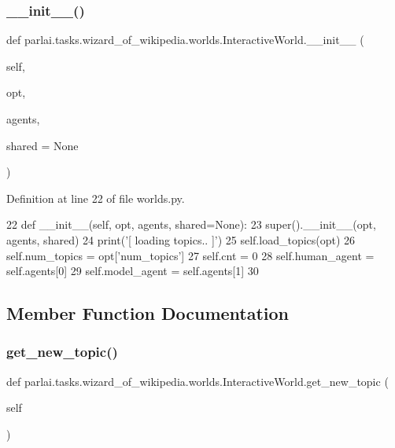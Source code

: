 \subsubsection{\texorpdfstring{\+\_\+\+\_\+init\+\_\+\+\_\+()}{\_\_init\_\_()}}
{\footnotesize\ttfamily def parlai.\+tasks.\+wizard\+\_\+of\+\_\+wikipedia.\+worlds.\+Interactive\+World.\+\_\+\+\_\+init\+\_\+\+\_\+ (\begin{DoxyParamCaption}\item[{}]{self,  }\item[{}]{opt,  }\item[{}]{agents,  }\item[{}]{shared = {\ttfamily None} }\end{DoxyParamCaption})}



Definition at line 22 of file worlds.\+py.


\begin{DoxyCode}
22     \textcolor{keyword}{def }\_\_init\_\_(self, opt, agents, shared=None):
23         super().\_\_init\_\_(opt, agents, shared)
24         print(\textcolor{stringliteral}{'[ loading topics.. ]'})
25         self.load\_topics(opt)
26         self.num\_topics = opt[\textcolor{stringliteral}{'num\_topics'}]
27         self.cnt = 0
28         self.human\_agent = self.agents[0]
29         self.model\_agent = self.agents[1]
30 
\end{DoxyCode}


\subsection{Member Function Documentation}
\mbox{\label{classparlai_1_1tasks_1_1wizard__of__wikipedia_1_1worlds_1_1InteractiveWorld_a01cde3e1317b31cf52024283f061fdf6}} 
\subsubsection{\texorpdfstring{get\+\_\+new\+\_\+topic()}{get\_new\_topic()}}
{\footnotesize\ttfamily def parlai.\+tasks.\+wizard\+\_\+of\+\_\+wikipedia.\+worlds.\+Interactive\+World.\+get\+\_\+new\+\_\+topic (\begin{DoxyParamCaption}\item[{}]{self }\end{DoxyParamCaption})}



